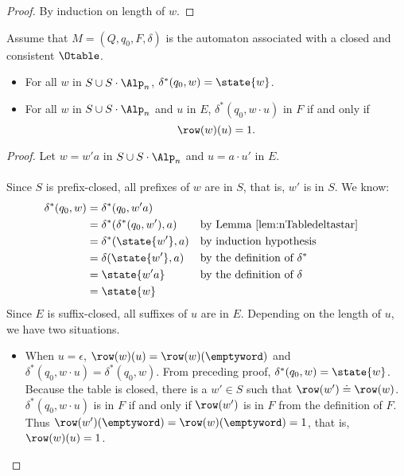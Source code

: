 \begin{proof}
  By induction on length of $w$.
\end{proof}

\begin{theorem}\label{thm:nTabledeltastar}
  Assume that  $M=(Q,q_0,F,\delta)$ is the automaton associated with a closed and consistent \nOtable $\Otable$.
  \begin{itemize}
  \item
    For all $w$ in $S\cup S\cdot {\Alp_n}$, $\delta^\ast(q_0,w)=\state{w}$.
  \item
    For all $w$ in $S\cup S\cdot {\Alp_n}$ and $u$ in $E$, $\delta^\ast(q_0,w\cdot u)$ in $F$ if and only if $$\row(w)(u)=1.$$
  \end{itemize}
\end{theorem}
\begin{proof}
  Let $w=w'a$ in $S\cup S\cdot {\Alp_n}$ and $u=a\cdot u'$ in $E$.\\
  \\
  Since $S$ is prefix-closed, all prefixes of $w$ are in $S$, that is, $w'$ is in $S$. We know:
  \begin{align*}
    \delta^\ast(q_0,w)&=\delta^\ast(q_0,w'a)\\
                      &=\delta^\ast(\delta^\ast(q_0,w'),a)&& \textrm{by Lemma~\ref{lem:nTabledeltastar}}\\
                      &=\delta^\ast(\state{w'},a)&& \textrm{by induction hypothesis}\\
                      &=\delta(\state{w'},a) && \textrm{by the definition of $\delta^\ast$}\\
                      &=\state{w'a} && \textrm{by the definition of $\delta$}\\
                      &=\state{w}
  \end{align*}
  Since $E$ is suffix-closed, all suffixes of $u$ are in $E$. Depending on the length of $u$, we have two situations.
  \begin{itemize}
  \item When
    $u=\epsilon$,
    $\row(w)(u)=\row(w)(\emptyword)$ and
    $\delta^\ast(q_0,w\cdot
    u)=\delta^\ast(q_0,w)$. From preceding
    proof,
    $\delta^\ast(q_0,w)=\state{w}$. Because
    the table is closed, there is a $w'\in
    S$ such that $\row(w')\doteq
    \row(w)$. $\delta^\ast(q_0,w\cdot
    u)$ is in $F$ if and only if
    $\row(w')$ is in
    $F$ from the definition of
    $F$. Thus
    $\row(w')(\emptyword)=\row(w)(\emptyword)=1$,
    that is, $\row(w)(u)=1$.

\end{itemize}
\end{proof}
